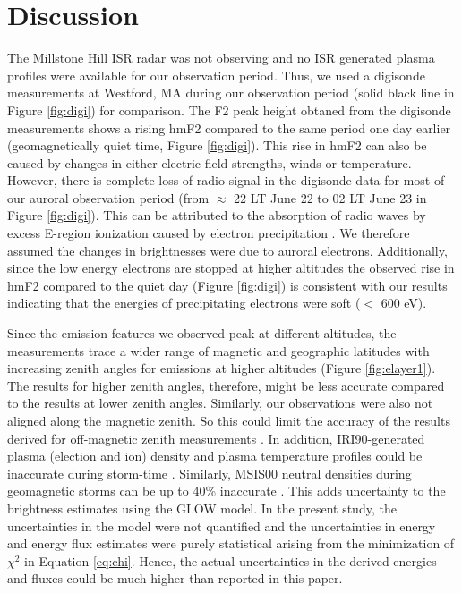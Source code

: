 \documentclass[crop=false,class=mitthesis,oneside,font=12pt]{standalone}
\begin{document}

\section{Discussion}
The Millstone Hill ISR radar was not observing and no ISR generated plasma profiles were available for our observation period. Thus, we used a digisonde \citep{giro} measurements at Westford, MA during our observation period (solid black line in Figure \ref{fig:digi}) for comparison. The F2 peak height obtaned from the digisonde measurements shows a rising hmF2 compared to the same period one day earlier (geomagnetically quiet time, Figure \ref{fig:digi}). This rise in hmF2 can also be caused by changes in either electric field strengths, winds or temperature. However, there is complete loss of radio signal in the digisonde data for most of our auroral observation period (from $\approx$ 22 LT June 22 to 02 LT June 23 in Figure \ref{fig:digi}). This can be attributed to the absorption of radio waves by excess E-region ionization caused by electron precipitation \citep{pallamraju_2011}. We therefore assumed the changes in brightnesses were due to auroral electrons. Additionally, since the low energy electrons are stopped at higher altitudes \citep{rees_1963} the observed rise in
hmF2 compared to the quiet day (Figure \ref{fig:digi}) is consistent with our results indicating that the energies of precipitating electrons were soft ($<$ 600 eV).

Since the emission features we observed peak at different altitudes, the measurements trace a wider range of magnetic and geographic latitudes with increasing zenith angles for emissions at higher altitudes (Figure \ref{fig:elayer1}). The results for higher zenith angles, therefore, might be less accurate compared to the results at lower zenith angles. Similarly, our observations were also not aligned along the magnetic zenith. So this could limit the accuracy of the results derived for off-magnetic zenith measurements \citep{grubbs_multi_spec}. In addition, IRI90-generated plasma (election and ion) density and plasma temperature profiles could be inaccurate during storm-time \citep{iri_storm}. Similarly, MSIS00 neutral densities during geomagnetic storms can be up to 40\% inaccurate \citep{fang_variations_2012}. This adds uncertainty to the brightness estimates using the GLOW model. In the present study, the uncertainties in the model were not quantified and the uncertainties in energy and energy flux estimates were purely statistical arising from the minimization of $\chi^2$ in Equation \ref{eq:chi}. Hence, the actual uncertainties in the derived energies and fluxes could be much higher than reported in this paper.    
\end{document}

